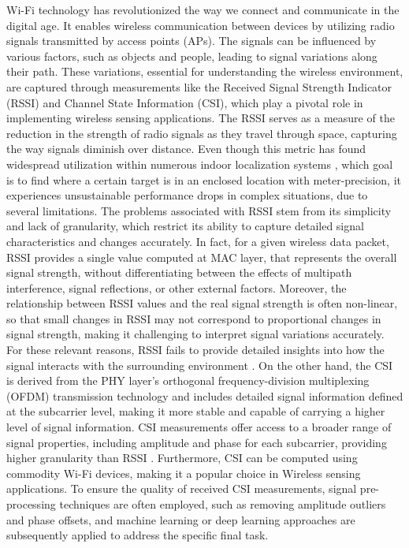 \documentclass[binding=0.7cm, oneside]{sapthesis}
\begin{document}
Wi-Fi technology has revolutionized the way we connect and communicate in the digital age. It enables wireless communication between devices by
utilizing radio signals transmitted by access points (APs). The signals can be influenced by various factors, such as objects and people,
leading to signal variations along their path. These variations, essential for understanding the wireless environment,
are captured through measurements like the Received Signal Strength Indicator (RSSI) and Channel State Information (CSI),
which play a pivotal role in implementing wireless sensing applications. The RSSI serves as a measure of the reduction in the strength of radio signals
as they travel through space, capturing the way signals diminish over distance. Even though this metric has found widespread utilization within numerous
indoor localization systems \cite{RSSI_indoorloc,RSSI_indoorloc_new}, which goal is to find where a certain target is in an enclosed location with meter-precision,
it experiences unsustainable performance drops in complex situations, due to several limitations. The problems associated with RSSI stem from its simplicity and
lack of granularity, which restrict its ability to capture detailed signal characteristics and changes accurately. In fact, for a given wireless data packet, RSSI
provides a single value computed at MAC layer, that represents the overall signal strength, without differentiating between the effects of multipath interference,
signal reflections, or other external factors. Moreover, the relationship between RSSI values and the real signal strength is often non-linear, so that small changes
in RSSI may not correspond to proportional changes in signal strength, making it challenging to interpret signal variations accurately. For these relevant reasons, RSSI fails
to provide detailed insights into how the signal interacts with the surrounding environment \cite{RSSI_reliability_indoorloc}. On the other hand, the CSI is derived
from the PHY layer's orthogonal frequency-division multiplexing (OFDM) transmission technology and includes detailed signal information defined at the subcarrier level,
making it more stable and capable of carrying a higher level of signal information. CSI measurements offer access to a broader range of signal properties, including
amplitude and phase for each subcarrier, providing higher granularity than RSSI \cite{CSI_RSSI}. Furthermore, CSI can be computed using commodity Wi-Fi devices,
making it a popular choice in Wireless sensing applications. To ensure the quality of received CSI measurements, signal pre-processing techniques are often employed,
such as removing amplitude outliers and phase offsets, and machine learning or deep learning approaches are subsequently applied to address the specific final task.
\end{document}
